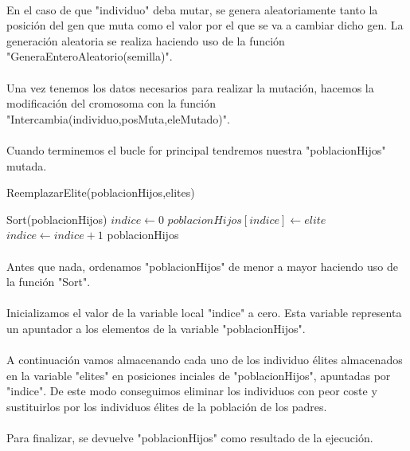 	\paragraph{}En el caso de que "individuo" deba mutar, se genera aleatoriamente tanto la posición del gen que muta como el valor por el que se va a cambiar dicho gen. La generación aleatoria se realiza haciendo uso de la función "GeneraEnteroAleatorio(semilla)".
	
	\paragraph{}Una vez tenemos los datos necesarios para realizar la mutación, hacemos la modificación del cromosoma con la función "Intercambia(individuo,posMuta,eleMutado)".
	
	\paragraph{}Cuando terminemos el bucle for principal tendremos nuestra "poblacionHijos" mutada.

	\begin{algorithm}[H]
		\caption{ReemplazarElite(poblacionHijos,elites)}
		\begin{algorithmic}
			\STATE Sort(poblacionHijos)
			\STATE $indice \leftarrow 0$
			\STATE $poblacionHijos[indice] \leftarrow elite$
			\STATE $indice \leftarrow indice+1$
			\ENDFOR
			\RETURN poblacionHijos
		\end{algorithmic}
	\end{algorithm}

	\paragraph{}Antes que nada, ordenamos "poblacionHijos" de menor a mayor haciendo uso de la función "Sort".
	
	\paragraph{}Inicializamos el valor de la variable local "indice" a cero. Esta variable representa un apuntador a los elementos de la variable "poblacionHijos".
	
	\paragraph{}A continuación vamos almacenando cada uno de los individuo élites almacenados en la variable "elites" en posiciones inciales de "poblacionHijos", apuntadas por "indice". De este modo conseguimos eliminar los individuos con peor coste y sustituirlos por los individuos élites de la población de los padres.
	
	\paragraph{}Para finalizar, se devuelve "poblacionHijos" como resultado de la ejecución.
	
	\newpage
	